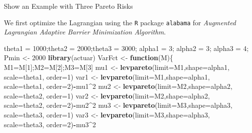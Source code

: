 \documentclass[]{book}
\newenvironment{Shaded}{\begin{snugshade}}{\end{snugshade}}
\newcommand{\KeywordTok}[1]{\textcolor[rgb]{0.13,0.29,0.53}{\textbf{#1}}}
\newcommand{\DataTypeTok}[1]{\textcolor[rgb]{0.13,0.29,0.53}{#1}}
\newcommand{\DecValTok}[1]{\textcolor[rgb]{0.00,0.00,0.81}{#1}}
\newcommand{\StringTok}[1]{\textcolor[rgb]{0.31,0.60,0.02}{#1}}
\newcommand{\ControlFlowTok}[1]{\textcolor[rgb]{0.13,0.29,0.53}{\textbf{#1}}}
\newcommand{\OperatorTok}[1]{\textcolor[rgb]{0.81,0.36,0.00}{\textbf{#1}}}
\newcommand{\NormalTok}[1]{#1}
\theoremstyle{definition}
\theoremstyle{definition}
\theoremstyle{definition}
\theoremstyle{remark}
\begin{document}
Show an Example with Three Pareto Risks

\hypertarget{toggleParetoRisksExcess}{}
We first optimize the Lagrangian using the \texttt{R} package
\texttt{alabama} for \emph{Augmented Lagrangian Adaptive Barrier
Minimization Algorithm}.

\begin{Shaded}
\begin{Highlighting}[]
\NormalTok{theta1 =}\StringTok{ }\DecValTok{1000}\NormalTok{;theta2 =}\StringTok{ }\DecValTok{2000}\NormalTok{;theta3 =}\StringTok{ }\DecValTok{3000}\NormalTok{;}
\NormalTok{alpha1 =}\StringTok{ }\DecValTok{3}\NormalTok{;   alpha2 =}\StringTok{ }\DecValTok{3}\NormalTok{;   alpha3 =}\StringTok{ }\DecValTok{4}\NormalTok{;}
\NormalTok{Pmin <-}\StringTok{ }\DecValTok{2000}
\KeywordTok{library}\NormalTok{(actuar)}
\NormalTok{VarFct <-}\StringTok{ }\ControlFlowTok{function}\NormalTok{(M)\{}
\NormalTok{  M1=M[}\DecValTok{1}\NormalTok{];M2=M[}\DecValTok{2}\NormalTok{];M3=M[}\DecValTok{3}\NormalTok{]}
\NormalTok{  mu1    <-}\StringTok{ }\KeywordTok{levpareto}\NormalTok{(}\DataTypeTok{limit=}\NormalTok{M1,}\DataTypeTok{shape=}\NormalTok{alpha1, }\DataTypeTok{scale=}\NormalTok{theta1, }\DataTypeTok{order=}\DecValTok{1}\NormalTok{)}
\NormalTok{  var1   <-}\StringTok{ }\KeywordTok{levpareto}\NormalTok{(}\DataTypeTok{limit=}\NormalTok{M1,}\DataTypeTok{shape=}\NormalTok{alpha1, }\DataTypeTok{scale=}\NormalTok{theta1, }\DataTypeTok{order=}\DecValTok{2}\NormalTok{)}\OperatorTok{-}\NormalTok{mu1}\OperatorTok{^}\DecValTok{2}
\NormalTok{  mu2    <-}\StringTok{ }\KeywordTok{levpareto}\NormalTok{(}\DataTypeTok{limit=}\NormalTok{M2,}\DataTypeTok{shape=}\NormalTok{alpha2, }\DataTypeTok{scale=}\NormalTok{theta2, }\DataTypeTok{order=}\DecValTok{1}\NormalTok{)}
\NormalTok{  var2   <-}\StringTok{ }\KeywordTok{levpareto}\NormalTok{(}\DataTypeTok{limit=}\NormalTok{M2,}\DataTypeTok{shape=}\NormalTok{alpha2, }\DataTypeTok{scale=}\NormalTok{theta2, }\DataTypeTok{order=}\DecValTok{2}\NormalTok{)}\OperatorTok{-}\NormalTok{mu2}\OperatorTok{^}\DecValTok{2}
\NormalTok{  mu3    <-}\StringTok{ }\KeywordTok{levpareto}\NormalTok{(}\DataTypeTok{limit=}\NormalTok{M3,}\DataTypeTok{shape=}\NormalTok{alpha3, }\DataTypeTok{scale=}\NormalTok{theta3, }\DataTypeTok{order=}\DecValTok{1}\NormalTok{)}
\NormalTok{  var3   <-}\StringTok{ }\KeywordTok{levpareto}\NormalTok{(}\DataTypeTok{limit=}\NormalTok{M3,}\DataTypeTok{shape=}\NormalTok{alpha3, }\DataTypeTok{scale=}\NormalTok{theta3, }\DataTypeTok{order=}\DecValTok{2}\NormalTok{)}\OperatorTok{-}\NormalTok{mu3}\OperatorTok{^}\DecValTok{2}

\end{Highlighting}
\end{Shaded}
\end{document}
